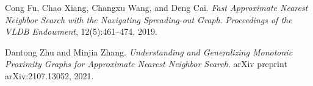 \documentclass{article}
\begin{document}
\begin{thebibliography}{9}
Cong Fu, Chao Xiang, Changxu Wang, and Deng Cai.\newline
\emph{Fast Approximate Nearest Neighbor Search with the Navigating Spreading\hyp out Graph}.\newline
\textit{Proceedings of the VLDB Endowment}, 12(5):461--474, 2019.

Dantong Zhu and Minjia Zhang.\newline
\emph{Understanding and Generalizing Monotonic Proximity Graphs for Approximate Nearest Neighbor Search}.\newline
arXiv preprint arXiv:2107.13052, 2021.
\end{thebibliography}
\end{document}
